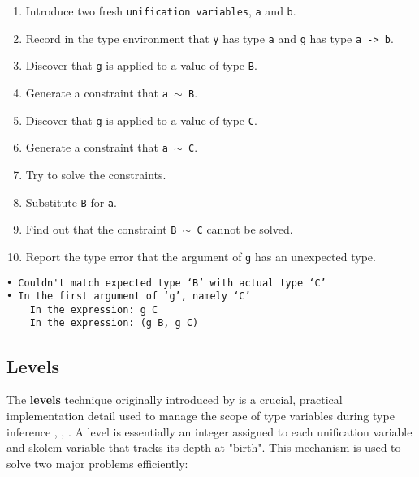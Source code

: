 \begin{enumerate}
    \item Introduce two fresh \texttt{unification variables}, \texttt{a} and \texttt{b}.
    \item Record in the type environment that \texttt{y} has type \texttt{a} and \texttt{g} has type \texttt{a -> b}.
    \item Discover that \texttt{g} is applied to a value of type \texttt{B}.
    \item Generate a constraint that \texttt{a $\sim$ B}.
    \item Discover that \texttt{g} is applied to a value of type \texttt{C}.
    \item Generate a constraint that \texttt{a $\sim$ C}.
    \item Try to solve the constraints.
    \item Substitute \texttt{B} for \texttt{a}.
    \item Find out that the constraint \texttt{B $\sim$ C} cannot be solved.
    \item Report the type error that the argument of \texttt{g} has an unexpected type.
\end{enumerate}

\begin{verbatim}
• Couldn't match expected type ‘B’ with actual type ‘C’
• In the first argument of ‘g’, namely ‘C’
    In the expression: g C
    In the expression: (g B, g C)
\end{verbatim}

\subsection{Levels}

The \textbf{levels} technique originally introduced by \citeauthor{remy-levels} \cite{remy-levels} is a crucial, practical implementation detail used to manage the scope of type variables during type inference \cite{practical-type-inference-with-levels-2025}, \cite{wits-type-inference-using-constraints}, \cite{levels-wits25-2025}. A level is essentially an integer assigned to each unification variable and skolem variable that tracks its depth at "birth". This mechanism is used to solve two major problems efficiently:


